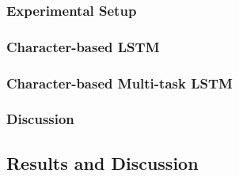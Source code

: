 \subsubsection{Experimental Setup}

\subsubsection{Character-based LSTM}

\subsubsection{Character-based Multi-task LSTM}

\subsubsection{Discussion}

\subsection{Results and Discussion}
